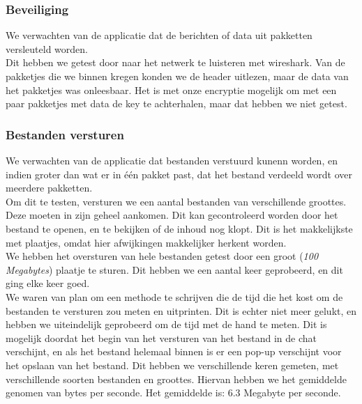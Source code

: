 \documentclass{article}
\begin{document}
\subsubsection{Beveiliging}
We verwachten van de applicatie dat de berichten of data uit pakketten versleuteld worden. \\
Dit hebben we getest door naar het netwerk te luisteren met wireshark. Van de pakketjes die we binnen kregen konden we de header uitlezen, maar de data van het pakketjes was onleesbaar. Het is met onze encryptie mogelijk om met een paar pakketjes met data de key te achterhalen, maar dat hebben we niet getest. 

\subsubsection{Bestanden versturen}
We verwachten van de applicatie dat bestanden verstuurd kunenn worden, en indien groter dan wat er in \'{e}\'{e}n pakket past, dat het bestand verdeeld wordt over meerdere pakketten. \\
Om dit te testen, versturen we een aantal bestanden van verschillende groottes. Deze moeten in zijn geheel aankomen. Dit kan gecontroleerd worden door het bestand te openen, en te bekijken of de inhoud nog klopt. Dit is het makkelijkste met plaatjes, omdat hier afwijkingen makkelijker herkent worden. \\
We hebben het oversturen van hele bestanden getest door een groot (\emph{100 Megabytes}) plaatje te sturen. Dit hebben we een aantal keer geprobeerd, en dit ging elke keer goed.\\
We waren van plan om een methode te schrijven die de tijd die het kost om de bestanden te versturen zou meten en uitprinten. Dit is echter niet meer gelukt, en hebben we uiteindelijk geprobeerd om de tijd met de hand te meten. Dit is mogelijk doordat het begin van het versturen van het bestand in de chat verschijnt, en als het bestand helemaal binnen is er een pop-up verschijnt voor het opslaan van het bestand. Dit hebben we verschillende keren gemeten, met verschillende soorten bestanden en groottes. Hiervan hebben we het gemiddelde genomen van bytes per seconde. Het gemiddelde is: 6.3 Megabyte per seconde. 
\end{document}
